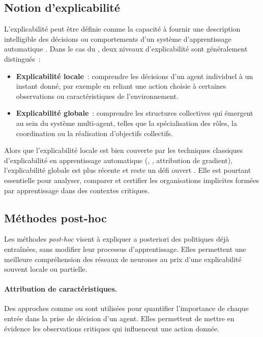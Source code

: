 \subsection{Notion d’explicabilité}

\noindent
L’explicabilité peut être définie comme la capacité à fournir une description intelligible
des décisions ou comportements d’un système d’apprentissage automatique \cite{doshivelez2017rigorous}.
Dans le cas du , deux niveaux d’explicabilité sont généralement distingués~:
\begin{itemize}
    \item \textbf{Explicabilité locale}~: comprendre les décisions d’un agent individuel
          à un instant donné, par exemple en reliant une action choisie
          à certaines observations ou caractéristiques de l’environnement.
    \item \textbf{Explicabilité globale}~: comprendre les structures collectives
          qui émergent au sein du système multi-agent, telles que la spécialisation
          des rôles, la coordination ou la réalisation d’objectifs collectifs.
\end{itemize}

Alors que l’explicabilité locale est bien couverte par les techniques classiques
d’explicabilité en apprentissage automatique (, , attribution de gradient),
l’explicabilité globale est plus récente et reste un défi ouvert
\cite{poupart2025perspectives, milani2022maviper}.
Elle est pourtant essentielle pour analyser, comparer et certifier
les organisations implicites formées par apprentissage dans des contextes critiques.

\subsection{Méthodes post-hoc}

\noindent
Les méthodes \textit{post-hoc} visent à expliquer a posteriori des politiques déjà entraînées,
sans modifier leur processus d’apprentissage.
Elles permettent une meilleure compréhension des réseaux de neurones
au prix d’une explicabilité souvent locale ou partielle.

\paragraph{Attribution de caractéristiques.}
Des approches comme  \cite{bach2015lrp}
ou  \cite{lundberg2017unified}
sont utilisées pour quantifier l’importance de chaque entrée
dans la prise de décision d’un agent.
Elles permettent de mettre en évidence les observations critiques
qui influencent une action donnée.

